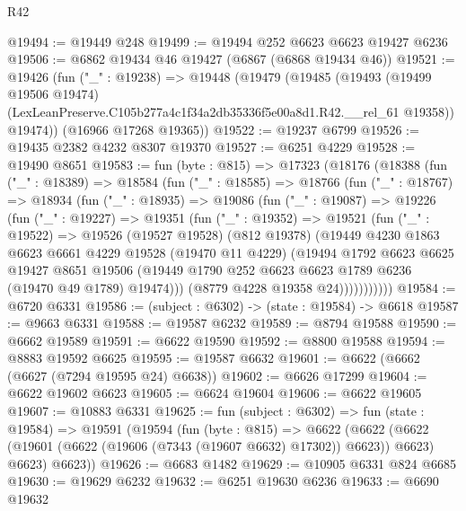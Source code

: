 \begin{lexlean}{R42}
\begin{coremodule}
{@19494 := @19449 @248
@19499 := @19494 @252 @6623 @6623 @19427 @6236
@19506 := @6862 @19434 @46 @19427 (@6867 (@6868 @19434 @46))
@19521 := @19426
    (fun ("_" : @19238) =>
    @19448
      (@19479
        (@19485
          (@19493
            (@19499 @19506 @19474)
            (LexLeanPreserve.C105b277a4c1f34a2db35336f5e00a8d1.R42.__rel_61 @19358))
          @19474))
      (@16966 @17268 @19365))
@19522 := @19237 @6799
@19526 := @19435 @2382 @4232 @8307 @19370
@19527 := @6251 @4229
@19528 := @19490 @8651
@19583 := fun (byte : @815) =>
  @17323
    (@18176
      (@18388
        (fun ("_" : @18389) =>
        @18584
          (fun ("_" : @18585) =>
          @18766
            (fun ("_" : @18767) =>
            @18934
              (fun ("_" : @18935) =>
              @19086
                (fun ("_" : @19087) =>
                @19226
                  (fun ("_" : @19227) =>
                  @19351
                    (fun ("_" : @19352) =>
                    @19521
                      (fun ("_" : @19522) =>
                      @19526
                        (@19527 @19528)
                        (@812 @19378)
                        (@19449
                          @4230
                          @1863
                          @6623
                          @6661
                          @4229
                          @19528
                          (@19470 @11 @4229)
                          (@19494
                            @1792
                            @6623
                            @6625
                            @19427
                            @8651
                            @19506
                            (@19449 @1790 @252 @6623 @6623 @1789 @6236 (@19470 @49 @1789) @19474)))
                        (@8779 @4228 @19358 @24)))))))))))
@19584 := @6720 @6331
@19586 := (subject : @6302) -> (state : @19584) -> @6618
@19587 := @9663 @6331
@19588 := @19587 @6232
@19589 := @8794 @19588
@19590 := @6662 @19589
@19591 := @6622 @19590
@19592 := @8800 @19588
@19594 := @8883 @19592 @6625
@19595 := @19587 @6632
@19601 := @6622 (@6662 (@6627 (@7294 @19595 @24) @6638))
@19602 := @6626 @17299
@19604 := @6622 @19602 @6623
@19605 := @6624 @19604
@19606 := @6622 @19605
@19607 := @10883 @6331
@19625 := fun (subject : @6302) =>
  fun (state : @19584) =>
  @19591
    (@19594
      (fun (byte : @815) =>
      @6622
        (@6622 (@6622 (@19601 (@6622 (@19606 (@7343 (@19607 @6632) @17302)) @6623)) @6623) @6623)
        @6623))
@19626 := @6683 @1482
@19629 := @10905 @6331 @824 @6685
@19630 := @19629 @6232
@19632 := @6251 @19630 @6236
@19633 := @6690 @19632
}
\end{coremodule}
\end{lexlean}
